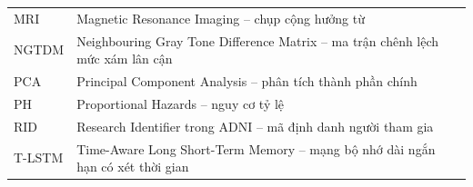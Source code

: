 {\begin{longtable}{@{}L{2.5cm}L{12.7cm}@{}}
MRI & Magnetic Resonance Imaging -- chụp cộng hưởng từ \\
NGTDM & Neighbouring Gray Tone Difference Matrix -- ma trận chênh lệch mức xám lân cận \\
PCA & Principal Component Analysis -- phân tích thành phần chính \\
PH & Proportional Hazards -- nguy cơ tỷ lệ \\
RID & Research Identifier trong ADNI -- mã định danh người tham gia \\
T-LSTM & Time-Aware Long Short-Term Memory -- mạng bộ nhớ dài ngắn hạn có xét thời gian \\
\bottomrule
\end{longtable}\par
}
